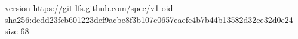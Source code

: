 version https://git-lfs.github.com/spec/v1
oid sha256:dedd23fcb601223def9acbe8f3b107c0657eaefe4b7b44b13582d32ee32d0e24
size 68
